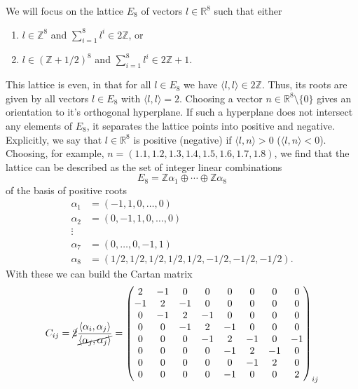 \documentclass{article}
\begin{document}
We will focus on the lattice $E_8$ of vectors $l\in\mathbb{R}^8$ such that either
\begin{enumerate}
    \item $l\in\mathbb{Z}^8$ and $\sum_{i=1}^8l^i\in 2\mathbb{Z}$, or
    \item $l\in(\mathbb{Z}+1/2)^8$ and $\sum_{i=1}^8l^i\in 2\mathbb{Z}+1$.
\end{enumerate}
This lattice is even, in that for all $l\in E_8$ we have $\langle l,l\rangle\in2\mathbb{Z}$. Thus, its roots are given by all vectors $l\in E_8$ with $\langle l,l\rangle=2$. Choosing a vector $n\in\mathbb{R}^8\setminus\{0\}$ gives an orientation to it's orthogonal hyperplane. If such a hyperplane does not intersect any elements of $E_8$, it separates the lattice points into positive and negative. Explicitly, we say that $l\in\mathbb{R}^8$ is positive (negative) if $\langle l, n\rangle>0$ ($\langle l,n\rangle<0$). Choosing, for example, $n=(1.1,1.2,1.3,1.4,1.5,1.6,1.7,1.8)$, we find that the lattice can be described as the set of integer linear combinations
\begin{equation}
    E_8=\mathbb{Z}\alpha_1\oplus\cdots\oplus\mathbb{Z}\alpha_8
\end{equation}
of the basis of positive roots
\begin{equation}
    \begin{aligned}
    \alpha_1&=(-1,1,0,\dots,0)\\
    \alpha_2&=(0,-1,1,0,\dots,0)\\
    \vdots&\\
    \alpha_7 & = (0,\dots,0,-1,1)\\
    \alpha_8 &=(1/2,1/2,1/2,1/2,1/2,-1/2,-1/2,-1/2).
    \end{aligned}
\end{equation}
With these we can build the Cartan matrix
\begin{equation}
C_{ij}=\cancel{2}\frac{\langle \alpha_i,\alpha_j\rangle}{\cancel{\langle \alpha_j,\alpha_j\rangle}}=\mqty(2&-1 &0 &0 &0 &0 &0 &0\\
-1 &2 &-1 &0 &0 &0 &0 &0\\
0& -1 &2 &-1 &0 &0 &0 &0\\
0 &0&-1 &2 &-1 &0 &0 &0 \\
0 &0&0&-1 &2 &-1 &0 &-1 \\
0 &0&0& 0&-1 &2 &-1 &0 \\
0&0&0&0 &0&-1 &2 &0\\
0 &0&0 &0 &-1 &0 &0 &2)_{ij}
\end{equation}
\end{document}
